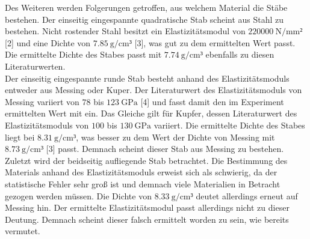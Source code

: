 Des Weiteren werden Folgerungen getroffen, aus welchem Material die 
Stäbe bestehen. Der einseitig eingespannte quadratische Stab scheint aus
Stahl zu bestehen. Nicht rostender Stahl besitzt ein Elastizitätsmodul von 
$\SI{220000}{\newton\per\milli\meter²}$ [2] und eine Dichte von 
$\SI{7.85}{\gram\per\centi\meter³}$ [3], was gut zu dem ermittelten 
Wert passt. Die ermittelte Dichte des Stabes passt mit 
$\SI{7.74}{\gram\per\centi\meter³}$ ebenfalls zu diesen Literaturwerten.
\\
Der einseitig eingespannte runde Stab besteht anhand des Elastizitätsmoduls
entweder aus Messing oder Kuper. Der Literaturwert des Elastizitätsmoduls
von Messing variiert von $\num{78}$ bis $ \SI{123}{\giga\pascal}$ [4] und fasst
damit den im Experiment ermittelten Wert mit ein. Das Gleiche gilt für 
Kupfer, dessen Literaturwert des Elastizitätsmoduls von
$\num{100}$ bis $\SI{130}{\giga\pascal}$ variiert. Die ermittelte Dichte des 
Stabes liegt bei $\SI{8.31}{\gram\per\centi\meter³}$, was besser zu dem Wert 
der Dichte von Messing mit $\SI{8.73}{\gram\per\centi\meter³}$ [3] passt. 
Demnach scheint dieser Stab aus Messing zu bestehen. 
\\
Zuletzt wird der beidseitig aufliegende Stab betrachtet. Die Bestimmung 
des Materials anhand des Elastizitätsmoduls erweist sich als schwierig, 
da der statistische Fehler sehr groß ist und demnach viele Materialien in
Betracht gezogen werden müssen. Die Dichte von $\SI{8.33}{\gram\per\centi\meter³}$
deutet allerdings erneut auf Messing hin. Der ermittelte Elastizitätsmodul
passt allerdings nicht zu dieser Deutung. Demnach scheint dieser falsch 
ermittelt worden zu sein, wie bereits vermutet. 